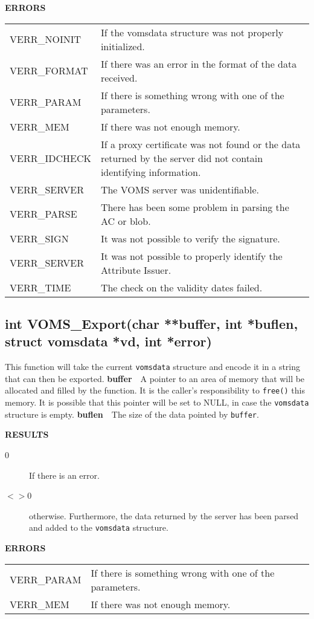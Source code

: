 \documentclass[a4paper]{book}
\newcommand{\errors}{\noindent \textbf{ERRORS}\newline}
\newcommand{\result}{\noindent \textbf{RESULTS}\newline}
\newcommand{\parameter}[1]{\newline\textbf{#1}\ \ }
\begin{document}
\errors
\bigskip\begin{tabular}{lp{3in}}
VERR\_NOINIT   & If the vomsdata structure was not properly
initialized.\\
VERR\_FORMAT   & If there was an error in the format of the data
received.\\
VERR\_PARAM    & If there is something wrong with one of the parameters.\\
VERR\_MEM      & If there was not enough memory.\\
VERR\_IDCHECK  & If a proxy certificate was not found or the data
returned by the server did not contain identifying information.\\
VERR\_SERVER   & The VOMS server was unidentifiable.\\
VERR\_PARSE    & There has been some problem in parsing the AC or
blob.\\
VERR\_SIGN     & It was not possible to verify the signature.\\
VERR\_SERVER   & It was not possible to properly identify the Attribute
Issuer.\\
VERR\_TIME     & The check on the validity dates failed.\\
\end{tabular}



\subsection{int VOMS\_Export(char **buffer, int *buflen, struct
  vomsdata *vd, int *error)}

This function will take the current \verb|vomsdata| structure and
encode it in a string that can then be exported.
\parameter{buffer}{A pointer to an area of memory that will be
  allocated and filled by the function.  It is the caller's
  responsibility to \verb|free()| this memory.  It is possible that
  this pointer will be set to NULL, in case the \verb|vomsdata|
  structure is empty.}
\parameter{buflen}{The size of the data pointed by \verb|buffer|.}

\result
\begin{description}
\item[0] If there is an error.
\item[$<>$0] otherwise.  Furthermore, the data returned by the server
  has been parsed and added to the \verb|vomsdata| structure.
\end{description}

\errors
\bigskip\begin{tabular}{lp{3in}}
VERR\_PARAM    & If there is something wrong with one of the parameters.\\
VERR\_MEM      & If there was not enough memory.\\
\end{tabular}
\end{document}
